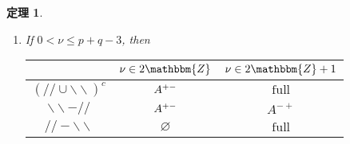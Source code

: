 \documentclass[12pt]{msjproc} %
\newcommand{\tmop}[1]{\ensuremath{\operatorname{#1}}}
\newtheorem{theorem}{定理}
\begin{document}
\begin{versiona}
\begin{theorem}
\begin{enumerate}
\begin{enumerate}
      \begin{center}
        \begin{center}
          \begin{center}
            \begin{center}
              \begin{tabular}{|c|c|c|}
                \hline
                & $\nu \in 2\mathbbm{Z}$ & $\nu \in 2\mathbbm{Z}+ 1$\\
                \hline
                $(/ / \cup \backslash\backslash)^c$ & $A^{\noplus + +}$ &
                $\tmop{full}$\\
                \hline
                $\backslash\backslash - / /$ & $A^{\noplus + +}$ & $A^{- +}$\\
                \hline
                $/ / -\backslash\backslash$ & $\varnothing$ & $\tmop{full}$\\
                \hline
              \end{tabular}
            \end{center}
          \end{center}
        \end{center}
      \end{center}
      
      \item If $0 < \nu \leqslant p + q - 3$, then
      
      \begin{center}
        \begin{center}
          \begin{center}
            \begin{center}
              \begin{tabular}{|c|c|c|}
                \hline
                & $\nu \in 2\mathbbm{Z}$ & $\nu \in 2\mathbbm{Z}+ 1$\\
                \hline
                $(/ / \cup \backslash\backslash)^c$ & $A^{ + -}$ &
                $\tmop{full}$\\
                \hline
                $\backslash\backslash - / /$ & $A^{ + -}$ & $A^{- +}$\\
                \hline
                $/ / -\backslash\backslash$ & $\varnothing$ & $\tmop{full}$\\
                \hline
              \end{tabular}
            \end{center}
          \end{center}
        \end{center}
      \end{center}
      

\end{enumerate}
\end{enumerate}
\end{theorem}
\end{versiona}
\end{document}
